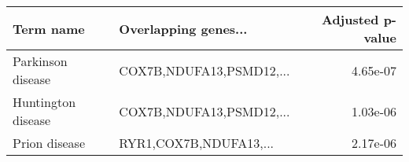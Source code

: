 \begin{tabular}{llr}
\toprule
         Term name &     Overlapping genes... &  Adjusted p-value \\
\midrule
 Parkinson disease & COX7B,NDUFA13,PSMD12,... &          4.65e-07 \\
Huntington disease & COX7B,NDUFA13,PSMD12,... &          1.03e-06 \\
     Prion disease &   RYR1,COX7B,NDUFA13,... &          2.17e-06 \\
\bottomrule
\end{tabular}
